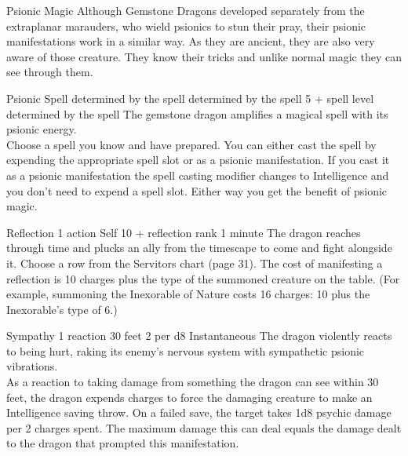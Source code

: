 \documentclass[letterpaper,twocolumn,openany]{dndbook}
\begin{document}
\begin{DndComment}{Psionic Magic}
  Although Gemstone Dragons developed separately from the extraplanar marauders, who wield psionics to stun their pray, their psionic manifestations work in a similar way.
  As they are ancient, they are also very aware of those creature.
  They know their tricks and unlike normal magic they can see through them.
\end{DndComment}

\DndPsiHeader
  {Psionic Spell}
  {}
  {determined by the spell}
  {determined by the spell}
  {5 + spell level}
  {determined by the spell}
  The gemstone dragon amplifies a magical spell with its psionic energy.\\
  Choose a spell you know and have prepared.
  You can either cast the spell by expending the appropriate spell slot or as a psionic manifestation.
  If you cast it as a psionic manifestation the spell casting modifier changes to Intelligence and you don't need to expend a spell slot.
  Either way you get the benefit of psionic magic.

\DndPsiHeader
  {Reflection}
  {}
  {1 action }
  {Self}
  {10 + reflection rank}
  {1 minute}
  The dragon reaches through time and plucks an ally from the timescape to come and fight alongside it. Choose a row from the Servitors chart (page 31). The cost of manifesting a reflection is 10 charges plus the type of the summoned creature on the table. (For example, summoning the Inexorable of Nature costs 16 charges: 10 plus the Inexorable’s type of 6.)

\DndPsiHeader
  {Sympathy}
  {}
  {1 reaction}
  {30 feet}
  {2 per d8}
  {Instantaneous}
  The dragon violently reacts to being hurt, raking its enemy’s nervous system with sympathetic psionic vibrations.\\
  As a reaction to taking damage from something the dragon can see within 30 feet, the dragon expends charges to force the damaging creature to make an Intelligence saving throw. On a failed save, the target takes 1d8 psychic damage per 2 charges spent. The maximum damage this can deal equals the damage dealt to the dragon that prompted this manifestation.

\endgroup

\end{document}
